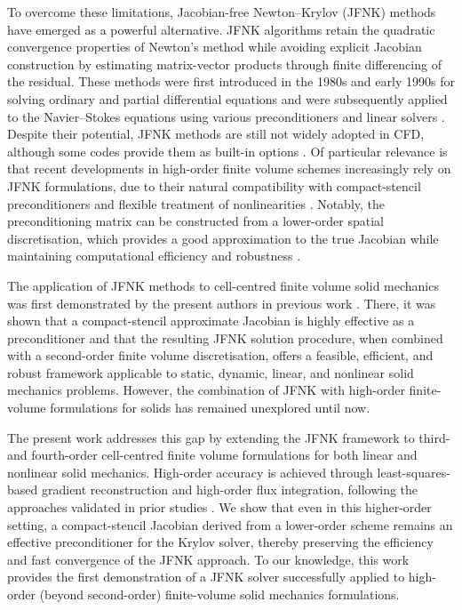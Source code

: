 \documentclass[review,3p]{elsarticle}
\begin{document}
To overcome these limitations, Jacobian-free Newton–Krylov (JFNK) methods have emerged as a powerful alternative. JFNK algorithms retain the quadratic convergence properties of Newton’s method while avoiding explicit Jacobian construction by estimating matrix-vector products through finite differencing of the residual. These methods were first introduced in the 1980s and early 1990s for solving ordinary and partial differential equations \cite{Gear1983, Chan1984, Brown1986, Brown1990} and were subsequently applied to the Navier–Stokes equations using various preconditioners and linear solvers \cite{Qin2000, Geuzaine2001, Pernice2001, Nejat2008}. Despite their potential, JFNK methods are still not widely adopted in CFD, although some codes provide them as built-in options \cite{Nakashima2025}. Of particular relevance is that recent developments in high-order finite volume schemes increasingly rely on JFNK formulations, due to their natural compatibility with compact-stencil preconditioners and flexible treatment of nonlinearities \cite{Nishikawa2025, Qin2018}. Notably, the preconditioning matrix can be constructed from a lower-order spatial discretisation, which provides a good approximation to the true Jacobian while maintaining computational efficiency and robustness \cite{Qin2000, Geuzaine2001, Pernice2001, Nejat2008, Mchugh1994,  Knoll2004, Vaassen2008, Lucas2010,  Nishikawa2020}. 

The application of JFNK methods to cell-centred finite volume solid mechanics was first demonstrated by the present authors in previous work \cite{Cardiff2026}. There, it was shown that a compact-stencil approximate Jacobian is highly effective as a preconditioner and that the resulting JFNK solution procedure, when combined with a second-order finite volume discretisation, offers a feasible, efficient, and robust framework applicable to static, dynamic, linear, and nonlinear solid mechanics problems. However, the combination of JFNK with high-order finite-volume formulations for solids has remained unexplored until now.

The present work addresses this gap by extending the JFNK framework to third- and fourth-order cell-centred finite volume formulations for both linear and nonlinear solid mechanics. High-order accuracy is achieved through least-squares-based gradient reconstruction and high-order flux integration, following the approaches validated in prior studies \cite{Castrillo2022, Castrillo2024}. We show that even in this higher-order setting, a compact-stencil Jacobian derived from a lower-order scheme remains an effective preconditioner for the Krylov solver, thereby preserving the efficiency and fast convergence of the JFNK approach. To our knowledge, this work provides the first demonstration of a JFNK solver successfully applied to high-order (beyond second-order) finite-volume solid mechanics formulations.
\end{document}
